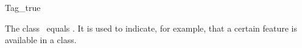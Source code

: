 \begin{ccRefClass}{Tag_true}

\ccDefinition

The class \ccRefName\ equals .
It is used to indicate, for example,
that a certain feature is available in a class.



\ccSeeAlso
{} \\
 \\

\end{ccRefClass}